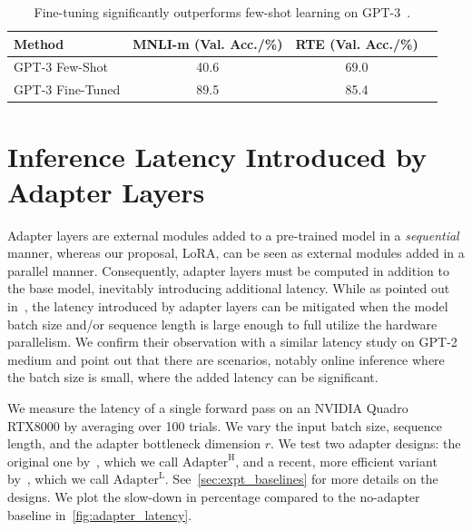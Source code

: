 \documentclass{article} %
\begin{document}
\begin{table}[h]
\centering
\begin{tabular}{l|ccc}
\hline
\toprule
Method           & MNLI-m (Val. Acc./\%) & RTE (Val. Acc./\%) \\
\midrule
GPT-3 Few-Shot   & 40.6 & 69.0 \\
GPT-3 Fine-Tuned & 89.5 & 85.4 \\
\bottomrule
\end{tabular}
\caption{Fine-tuning significantly outperforms few-shot learning on GPT-3~\citep{brown_language_2020}.  }
\label{tab:gpt3_fs_ft_results}
\end{table}



\section{Inference Latency Introduced by Adapter Layers}
\label{app:adapter_latency}
Adapter layers are external modules added to a pre-trained model in a \textit{sequential} manner, whereas our proposal, LoRA, can be seen as external modules added in a parallel manner.
Consequently, adapter layers must be computed in addition to the base model, inevitably introducing additional latency.
While as pointed out in~\cite{ruckle2020adapterdrop}, the latency introduced by adapter layers can be mitigated when the model batch size and/or sequence length is large enough to full utilize the hardware parallelism.
We confirm their observation with a similar latency study on GPT-2 medium and point out that there are scenarios, notably online inference where the batch size is small, where the added latency can be significant.

We measure the latency of a single forward pass on an NVIDIA Quadro RTX8000 by averaging over 100 trials.
We vary the input batch size, sequence length, and the adapter bottleneck dimension $r$.
We test two adapter designs: the original one by~\cite{houlsby_parameter-efficient_2019}, which we call $\text{Adapter}^{\text{H}}$, and a recent, more efficient variant by~\cite{lin-etal-2020-exploring}, which we call $\text{Adapter}^{\text{L}}$.
See~\autoref{sec:expt_baselines} for more details on the designs.
We plot the slow-down in percentage compared to the no-adapter baseline in~\autoref{fig:adapter_latency}.
\end{document}
